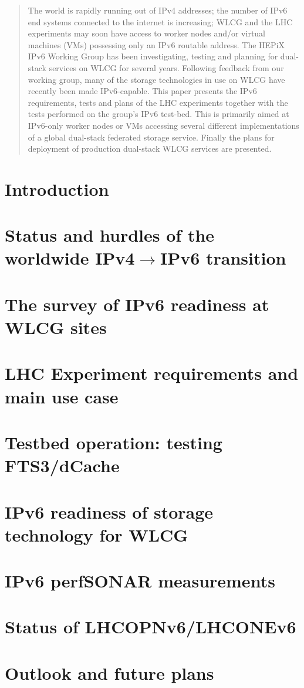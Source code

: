 \documentclass[a4paper]{jpconf}
\begin{document}
\begin{abstract}
The world is rapidly running out of IPv4 addresses; the number of IPv6 end systems connected
to the internet is increasing; WLCG and the LHC experiments may soon have access to worker
nodes and/or virtual machines (VMs) possessing only an IPv6 routable address. The HEPiX
IPv6 Working Group has been investigating, testing and
planning for dual-stack services on WLCG for several years. Following feedback from our
working group, many of the storage technologies in use on WLCG have recently been made
IPv6-capable.
This paper presents the IPv6 requirements, tests and plans of the LHC
experiments together with the tests performed on the group's IPv6 test-bed. 
This is primarily aimed at IPv6-only worker nodes or VMs
accessing several different implementations of a global dual-stack federated storage service.
Finally the plans for deployment of production dual-stack WLCG services are presented.
\end{abstract}

\section{Introduction}


\section{Status and hurdles of the worldwide IPv4$\rightarrow$IPv6 transition}


\section{The survey of IPv6 readiness at WLCG sites}


\section{LHC Experiment requirements and main use case}


\section{Testbed operation: testing FTS3/dCache}


\section{IPv6 readiness of storage technology for WLCG}


\section{IPv6 perfSONAR measurements}


\section{Status of LHCOPNv6/LHCONEv6}


\section{Outlook and future plans}



\par

\end{document}
